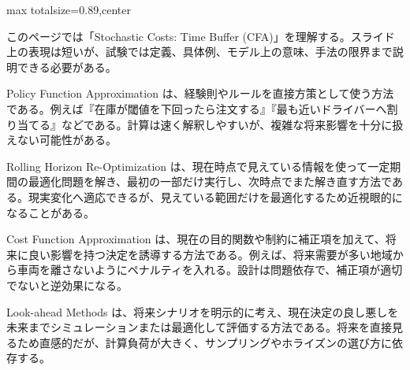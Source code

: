 \begin{minipage}[t]{0.58\textwidth}
\begin{adjustbox}{max totalsize={\textwidth}{0.89\textheight},center}
\begin{minipage}{\textwidth}\scriptsize
{}このページでは「Stochastic Costs: Time Buffer (CFA)」を理解する。スライド上の表現は短いが、試験では定義、具体例、モデル上の意味、手法の限界まで説明できる必要がある。\par
Policy Function Approximation は、経験則やルールを直接方策として使う方法である。例えば『在庫が閾値を下回ったら注文する』『最も近いドライバーへ割り当てる』などである。計算は速く解釈しやすいが、複雑な将来影響を十分に扱えない可能性がある。\par
Rolling Horizon Re-Optimization は、現在時点で見えている情報を使って一定期間の最適化問題を解き、最初の一部だけ実行し、次時点でまた解き直す方法である。現実変化へ適応できるが、見えている範囲だけを最適化するため近視眼的になることがある。\par
Cost Function Approximation は、現在の目的関数や制約に補正項を加えて、将来に良い影響を持つ決定を誘導する方法である。例えば、将来需要が多い地域から車両を離さないようにペナルティを入れる。設計は問題依存で、補正項が適切でないと逆効果になる。\par
Look-ahead Methods は、将来シナリオを明示的に考え、現在決定の良し悪しを未来までシミュレーションまたは最適化して評価する方法である。将来を直接見るため直感的だが、計算負荷が大きく、サンプリングやホライズンの選び方に依存する。\par

\end{minipage}
\end{adjustbox}
\end{minipage}
